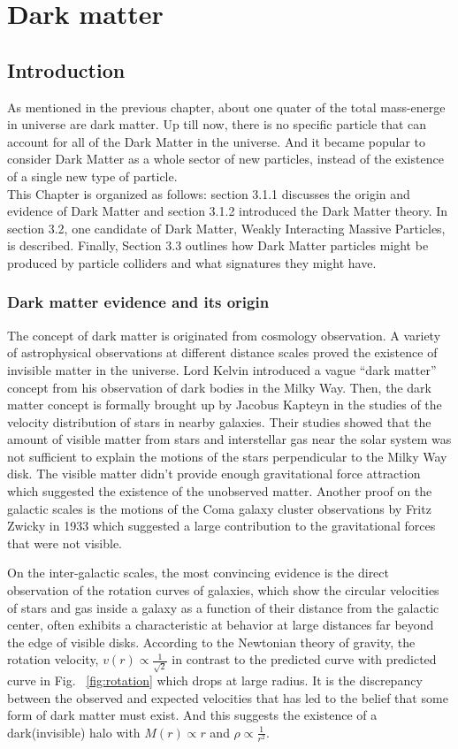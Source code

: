 \chapter{Dark matter}
\label{ch:dm}
\section{Introduction}
As mentioned in the previous chapter, about one quater of the total mass-energe in universe are dark matter.
Up till now, there is no specific particle that can account for all of the Dark Matter in the universe. And it became popular to consider Dark Matter 
as a whole sector of new particles, instead of the existence of a single new type of particle.\\
This Chapter is organized as follows: section 3.1.1 discusses the origin and evidence of Dark Matter and 
section 3.1.2 introduced the Dark Matter theory. In section 3.2, one candidate of Dark Matter, Weakly Interacting Massive Particles, is described.
Finally, Section 3.3 outlines how Dark Matter particles might be produced by particle colliders and what signatures they might have.

\subsection{Dark matter evidence and its origin}
The concept of dark matter is originated from cosmology observation. A variety of astrophysical observations at different distance scales proved the existence of invisible matter in the universe.
 Lord Kelvin introduced a vague “dark matter” concept from his observation of dark bodies in the Milky Way. 
Then, the dark matter concept is formally brought up by Jacobus Kapteyn in the studies of the velocity distribution of stars in nearby galaxies\cite{Kapteyn:1922zz}.
 Their studies showed that the amount of visible matter from stars and interstellar gas near the solar system was not sufficient to 
explain the motions of the stars perpendicular to the Milky Way disk. The visible matter didn't provide enough gravitational force attraction which suggested 
the existence of the unobserved matter. Another proof on the galactic scales is the motions of the Coma galaxy cluster observations by Fritz Zwicky in 1933 
\cite{Zwicky:1933gu} which suggested a large contribution to the gravitational forces that were not visible. 

 On the inter-galactic scales, the most convincing evidence is the direct observation of the rotation curves of galaxies, which show the circular velocities of stars and
 gas inside a galaxy as a function of their distance from the galactic center, often exhibits a characteristic at behavior at large distances far beyond the edge of visible disks. 
According to the Newtonian theory of gravity,  the rotation velocity, $v(r) \propto \frac{1}{\sqrt{2}}$ in contrast to the predicted curve with predicted curve in Fig. ~\ref{fig:rotation} which drops at large radius.   It is the discrepancy between the observed and expected velocities that has led to the belief that some form of dark matter must exist. 
And this suggests the existence of a dark(invisible) halo with $M(r) \propto r$ and $\rho \propto \frac{1}{r^2}$.


